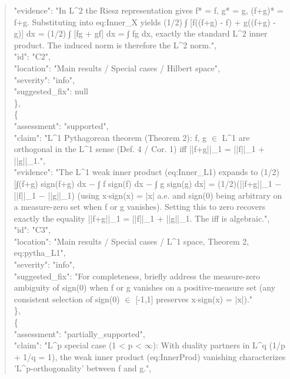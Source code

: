 \documentclass[11pt]{article}
\begin{document}
\begin{quote}
      "evidence": "In L\^{}2 the Riesz representation gives f* = f, g* = g, (f+g)* = f+g. Substituting into eq:Inner\_X yields (1/2) ∫ [f((f+g) - f) + g((f+g) - g)] dx = (1/2) ∫ [fg + gf] dx = ∫ fg dx, exactly the standard L\^{}2 inner product. The induced norm is therefore the L\^{}2 norm.",\\
      "id": "C2",\\
      "location": "Main results / Special cases / Hilbert space",\\
      "severity": "info",\\
      "suggested\_fix": null\\
    \},\\
    \{\\
      "assessment": "supported",\\
      "claim": "L\^{}1 Pythagorean theorem (Theorem 2): f, g \ensuremath{\in} L\^{}1 are orthogonal in the L\^{}1 sense (Def. 4 / Cor. 1) iff ||f+g||\_1 = ||f||\_1 + ||g||\_1.",\\
      "evidence": "The L\^{}1 weak inner product (eq:Inner\_L1) expands to (1/2)[∫(f+g) sign(f+g) dx \ensuremath{-} ∫ f sign(f) dx \ensuremath{-} ∫ g sign(g) dx] = (1/2)(||f+g||\_1 \ensuremath{-} ||f||\_1 \ensuremath{-} ||g||\_1) (using x\ensuremath{\cdot}sign(x) = |x| a.e. and sign(0) being arbitrary on a measure-zero set when f or g vanishes). Setting this to zero recovers exactly the equality ||f+g||\_1 = ||f||\_1 + ||g||\_1. The iff is algebraic.",\\
      "id": "C3",\\
      "location": "Main results / Special cases / L\^{}1 space, Theorem 2, eq:pytha\_L1",\\
      "severity": "info",\\
      "suggested\_fix": "For completeness, briefly address the measure-zero ambiguity of sign(0) when f or g vanishes on a positive-measure set (any consistent selection of sign(0) \ensuremath{\in} [-1,1] preserves x\ensuremath{\cdot}sign(x) = |x|)."\\
    \},\\
    \{\\
      "assessment": "partially\_supported",\\
      "claim": "L\^{}p special case (1 < p < \ensuremath{\infty}): With duality partners in L\^{}q (1/p + 1/q = 1), the weak inner product (eq:InnerProd) vanishing characterizes 'L\^{}p-orthogonality' between f and g.",\\

\end{quote}
\end{document}

